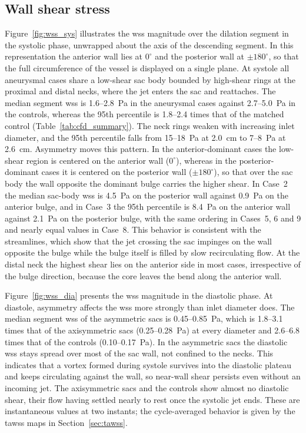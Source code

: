 \documentclass[12pt,a4paper]{article}
\newcommand{\WSS}{\ac{wss}\xspace}
\newcommand{\TAWSS}{\ac{tawss}\xspace}
\theoremstyle{definition}
\numberwithin{equation}{section}
\begin{document}
\subsection{Wall shear stress}
Figure~\ref{fig:wss_sys} illustrates the \WSS magnitude over the dilation segment in the systolic phase, unwrapped about the axis of the descending segment. In this representation the anterior wall lies at \(0^\circ\) and the posterior wall at \(\pm180^\circ\), so that the full circumference of the vessel is displayed on a single plane. At systole all aneurysmal cases share a low-shear sac body bounded by high-shear rings at the proximal and distal necks, where the jet enters the sac and reattaches. The median segment \WSS is 1.6--2.8~Pa in the aneurysmal cases against 2.7--5.0~Pa in the controls, whereas the 95th percentile is 1.8--2.4 times that of the matched control (Table~\ref{tab:cfd_summary}). The neck rings weaken with increasing inlet diameter, and the 95th percentile falls from 15--18~Pa at 2.0~cm to 7--8~Pa at 2.6~cm. Asymmetry moves this pattern. In the anterior-dominant cases the low-shear region is centered on the anterior wall (\(0^\circ\)), whereas in the posterior-dominant cases it is centered on the posterior wall (\(\pm180^\circ\)), so that over the sac body the wall opposite the dominant bulge carries the higher shear. In Case~2 the median sac-body \WSS is 4.5~Pa on the posterior wall against 0.9~Pa on the anterior bulge, and in Case~3 the 95th percentile is 8.4~Pa on the anterior wall against 2.1~Pa on the posterior bulge, with the same ordering in Cases~5, 6 and 9 and nearly equal values in Case~8. This behavior is consistent with the streamlines, which show that the jet crossing the sac impinges on the wall opposite the bulge while the bulge itself is filled by slow recirculating flow. At the distal neck the highest shear lies on the anterior side in most cases, irrespective of the bulge direction, because the core leaves the bend along the anterior wall.

Figure~\ref{fig:wss_dia} presents the \WSS magnitude in the diastolic phase. At
diastole, asymmetry affects the \WSS more strongly than inlet diameter does. The
median segment \WSS of the asymmetric sacs is 0.45--0.85~Pa, which is 1.8--3.1
times that of the axisymmetric sacs (0.25--0.28~Pa) at every diameter and
2.6--6.8 times that of the controls (0.10--0.17~Pa). In the asymmetric sacs the
diastolic \WSS stays spread over most of the sac wall, not confined to the necks.
This indicates that a vortex formed during systole survives into the diastolic
plateau and keeps circulating against the wall, so near-wall shear persists even
without an incoming jet. The axisymmetric sacs and the controls show almost no
diastolic shear, their flow having settled nearly to rest once the systolic jet
ends. These are instantaneous values at two instants; the cycle-averaged behavior
is given by the \TAWSS maps in Section~\ref{sec:tawss}.
\end{document}

